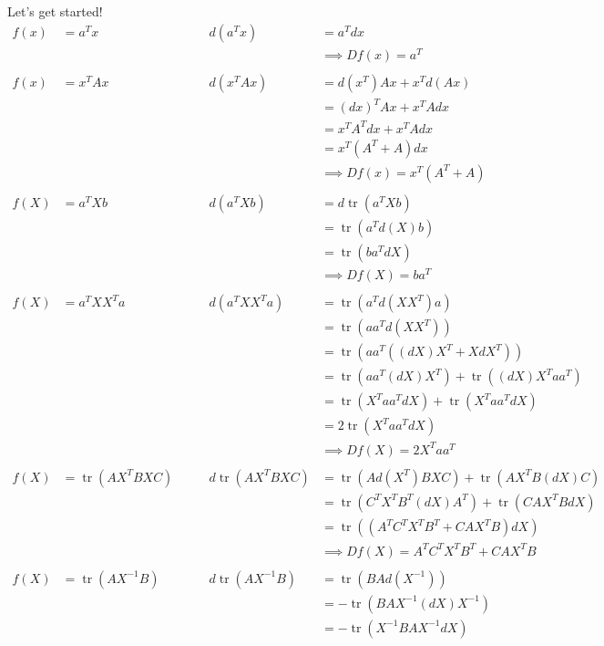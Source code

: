 \documentclass[a4paper,12pt]{article}
\begin{document}
Let's get started!
$$
\begin{alignat}{2}
f(x) &= a^Tx & \qquad d(a^Tx) &= a^Tdx \\
  & & &\implies Df(x) = a^T \\
\\
f(x) &= x^TAx & \qquad d(x^TAx) &= d(x^T)Ax + x^Td(Ax) \\
  & & &= (dx)^TAx + x^TAdx \\
  & & &= x^TA^Tdx + x^TAdx \\
  & & &= x^T(A^T+A)dx \\
  & & &\implies Df(x) = x^T(A^T+A) \\
\\
f(X) &= a^TXb & \qquad d(a^TXb) &= d\operatorname{tr}(a^TXb) \\
  & & &= \operatorname{tr}(a^Td(X)b) \\
  & & &= \operatorname{tr}(ba^TdX) \\
  & & &\implies Df(X) = ba^T \\
\\
f(X) &= a^TXX^Ta & \qquad d(a^TXX^Ta) &= \operatorname{tr}(a^Td(XX^T)a) \\
  & & &= \operatorname{tr}(aa^Td(XX^T)) \\
  & & &= \operatorname{tr}(aa^T((dX)X^T+XdX^T)) \\
  & & &= \operatorname{tr}(aa^T(dX)X^T) + \operatorname{tr}((dX)X^Taa^T) \\
  & & &= \operatorname{tr}(X^Taa^TdX) + \operatorname{tr}(X^Taa^TdX) \\
  & & &= 2\operatorname{tr}(X^Taa^TdX) \\
  & & &\implies Df(X) = 2X^Taa^T \\
\\
f(X) &= \operatorname{tr}(AX^TBXC) & \qquad d\operatorname{tr}(AX^TBXC) &= \operatorname{tr}(Ad(X^T)BXC) + \operatorname{tr}(AX^TB(dX)C) \\
  & & &= \operatorname{tr}(C^TX^TB^T(dX)A^T) + \operatorname{tr}(CAX^TBdX) \\
  & & &= \operatorname{tr}((A^TC^TX^TB^T + CAX^TB)dX) \\
  & & &\implies Df(X) = A^TC^TX^TB^T + CAX^TB \\
\\
f(X) &= \operatorname{tr}(AX^{-1}B) & \qquad d\operatorname{tr}(AX^{-1}B) &= \operatorname{tr}(BAd(X^{-1})) \\
  & & &= -\operatorname{tr}(BAX^{-1}(dX)X^{-1}) \\
  & & &= -\operatorname{tr}(X^{-1}BAX^{-1}dX) \\

\end{alignat}$$
\end{document}
